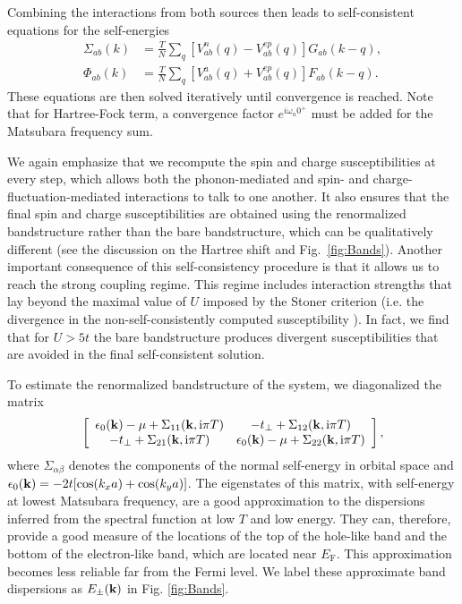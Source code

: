 \documentclass[%
 reprint,
 superscriptaddress,
nofootinbib,
nobibnotes,
 amsmath,amssymb,
 aps,
 prb,
 dvipsnames, 
 floatfix
]{revtex4-2}
\begin{document}
Combining the interactions from both sources then leads to self-consistent equations for the self-energies
\begin{align}
    \Sigma_{ab} (k) &= \frac{T}{N} \sum_q [ V_{ab}^n (q) - V^{ep}_{ab} (q) ] G^{\phantom a}_{ab} (k-q),
    \label{Eq:SelfEnergy1} \\
    \Phi_{ab} (k) &= \frac{T}{N} \sum_q [ V_{ab}^a (q) + V^{ep}_{ab} (q) ] F^{\phantom a}_{ab} (k-q).
    \label{Eq:SelfEnergy2} 
\end{align}
These equations are then solved iteratively until convergence is reached. Note that for Hartree-Fock term, a convergence factor $e^{i\omega_n 0^{+}}$ must be added for the Matsubara frequency sum.

We again emphasize that we recompute the spin and charge susceptibilities at every step, which allows both the phonon-mediated and spin- and charge-fluctuation-mediated interactions to talk to one another. It also ensures that the final spin and charge susceptibilities are obtained using the renormalized bandstructure rather than the bare bandstructure, which can be qualitatively different (see the discussion on the Hartree shift and Fig.~\ref{fig:Bands}). Another important consequence of this self-consistency procedure is that it allows us to reach the strong coupling regime. This regime includes interaction strengths that lay beyond the maximal value of $U$ imposed by the Stoner criterion (i.e. the divergence in the non-self-consistently computed susceptibility \cite{Schrodi:2020bz}). In fact, we find that for $U>5t$ the bare bandstructure produces divergent susceptibilities that are avoided in the final self-consistent solution.

To estimate the renormalized bandstructure of the system, we diagonalized the matrix
\begin{equation*}
    \left[\begin{array}{cc}\epsilon_0({\bf k})-\mu+\Sigma_{11}({\bf k},\mathrm{i}\pi T) & -t_\perp + \Sigma_{12} ({\bf k},\mathrm{i}\pi T)\\
    -t_\perp + \Sigma_{21} ({\bf k},\mathrm{i}\pi T) & \epsilon_0({\bf k})-\mu+\Sigma_{22}({\bf k},\mathrm{i}\pi T) \end{array}\right], 
\end{equation*}
where $\Sigma_{\alpha\beta}$ denotes the components of the normal self-energy in orbital 
space and $\epsilon_0({\bf k}) = -2t[\cos(k_xa)+\cos(k_ya)]$. The eigenstates of 
this matrix, with self-energy at lowest Matsubara frequency, are a good approximation to the dispersions inferred from the spectral function at low $T$ and low energy. They can, therefore, provide a good measure of the locations of the top of the hole-like band and the bottom of the electron-like band, which are located near $E_\mathrm{F}$. This approximation becomes less reliable far from the Fermi level. We label these approximate band dispersions as $E_\pm({\bf k})$ in Fig. \ref{fig:Bands}. 
\end{document}
